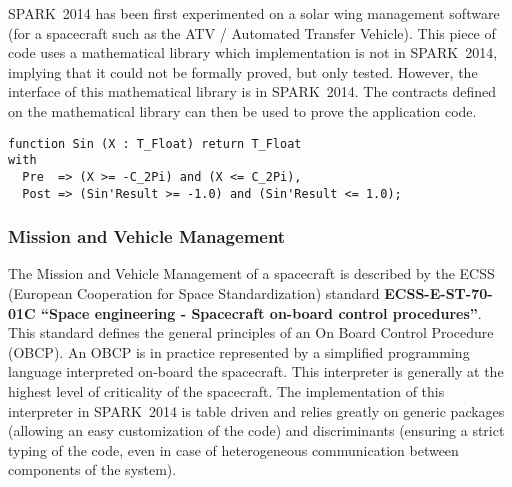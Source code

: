 \documentclass[10pt,a4paper,twocolumn]{article}
\newcommand{\newspark}{SPARK~2014\xspace}
\begin{document}
\newspark has been first experimented on a solar wing management software (for a spacecraft such as the ATV / Automated Transfer Vehicle).
This piece of code uses a mathematical library which implementation is not in \newspark, implying that it could not be formally proved, but only tested. However, the interface of this mathematical library is in \newspark. The contracts defined on the mathematical library can then be used to prove the application code.

\begin{lstlisting}
function Sin (X : T_Float) return T_Float
with
  Pre  => (X >= -C_2Pi) and (X <= C_2Pi),
  Post => (Sin'Result >= -1.0) and (Sin'Result <= 1.0);
\end{lstlisting}

\subsubsection{Mission and Vehicle Management}

The Mission and Vehicle Management of a spacecraft is described by the ECSS (European Cooperation for Space Standardization) standard
{\bf ECSS-E-ST-70-01C ``Space engineering - Spacecraft on-board control procedures''}.
This standard defines the general principles of an On Board Control Procedure
(OBCP). An OBCP is in practice represented by a simplified programming language
interpreted on-board the spacecraft. This interpreter is generally at the
highest level of criticality of the spacecraft. The implementation of this
interpreter in \newspark is table driven and relies greatly on generic packages
(allowing an easy customization of the code)
and discriminants
(ensuring a strict typing of the code, even in case of heterogeneous communication between components of the system).

\end{document}
